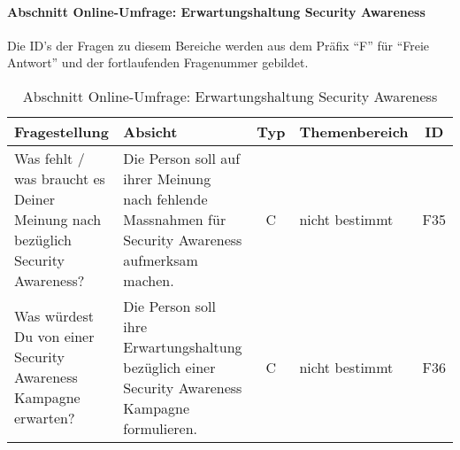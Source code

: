 \documentclass[../../main.tex]{subfiles}
\begin{document}
\paragraph*{Abschnitt Online-Umfrage: Erwartungshaltung Security Awareness}\mbox{}

\begin{sloppypar}
Die ID's der Fragen zu diesem Bereiche werden aus dem Präfix "`F"' für "`Freie Antwort"' und der fortlaufenden Fragenummer gebildet.
\end{sloppypar}


\sloppy 

\begin{table}[H]
\tablefontsize	
\centering
\caption{Abschnitt Online-Umfrage: Erwartungshaltung Security Awareness}
\label{Erwartungshaltung Security Awareness}
\begin{tabular}{ |p{5.5cm}|p{5.5cm}|c|p{2.5cm}|c|}

\hline
\tableheaderbgcolor
\textbf{Fragestellung} & \textbf{Absicht} & \textbf{Typ} & \textbf{Themenbereich} & \textbf{ID}\\ 
\hline
Was fehlt / was braucht es Deiner Meinung nach bezüglich Security Awareness? & Die Person soll auf ihrer Meinung nach fehlende Massnahmen für Security Awareness aufmerksam machen. & C & nicht bestimmt & F35 \\
\hline

Was würdest Du von einer Security Awareness Kampagne erwarten? & Die Person soll ihre Erwartungshaltung bezüglich einer Security Awareness Kampagne formulieren. & C & nicht bestimmt & F36 \\
\hline

\end{tabular}
\end{table}
\end{document}
